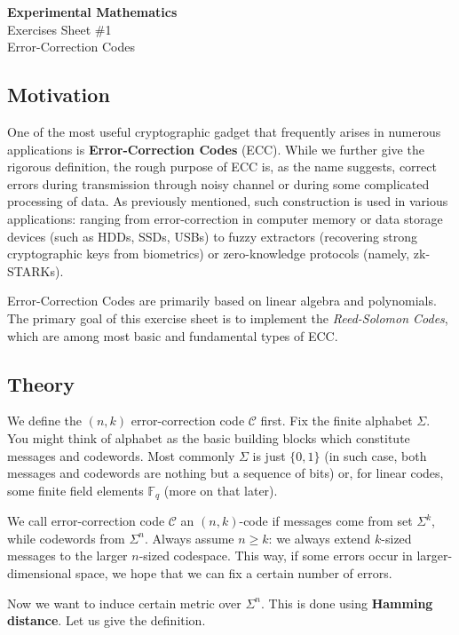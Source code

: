 \documentclass{test-template}
\begin{document}
\begin{center}
    \textbf{\Huge{Experimental Mathematics}} \\
    Exercises Sheet \#1 \\
    Error-Correction Codes
\end{center}

\subsection*{Motivation}

One of the most useful cryptographic gadget that frequently arises in numerous
applications is \textbf{Error-Correction Codes} (ECC). While we further give the
rigorous definition, the rough purpose of ECC is, as the name suggests, correct
errors during transmission through noisy channel or during some complicated
processing of data. As previously mentioned, such construction is used in
various applications: ranging from error-correction in computer memory or data
storage devices (such as HDDs, SSDs, USBs) to fuzzy extractors (recovering
strong cryptographic keys from biometrics) or zero-knowledge protocols (namely,
zk-STARKs).

Error-Correction Codes are primarily based on linear algebra and polynomials.
The primary goal of this exercise sheet is to implement the \textit{Reed-Solomon
Codes}, which are among most basic and fundamental types of ECC. 

\subsection*{Theory}

We define the $(n,k)$ error-correction code $\mathcal{C}$ first. Fix the finite
alphabet $\Sigma$. You might think of alphabet as the basic building blocks
which constitute messages and codewords. Most commonly $\Sigma$ is just
$\{0,1\}$ (in such case, both messages and codewords are nothing but a sequence
of bits) or, for linear codes, some finite field elements $\mathbb{F}_q$ (more
on that later).

We call error-correction code $\mathcal{C}$ an $(n,k)$-code if messages come
from set $\Sigma^k$, while codewords from $\Sigma^n$. Always assume $n \geq k$:
we always extend $k$-sized messages to the larger $n$-sized codespace. This way,
if some errors occur in larger-dimensional space, we hope that we can fix a
certain number of errors.

Now we want to induce certain metric over $\Sigma^n$. This is done using 
\textbf{Hamming distance}. Let us give the definition.
\end{document}
